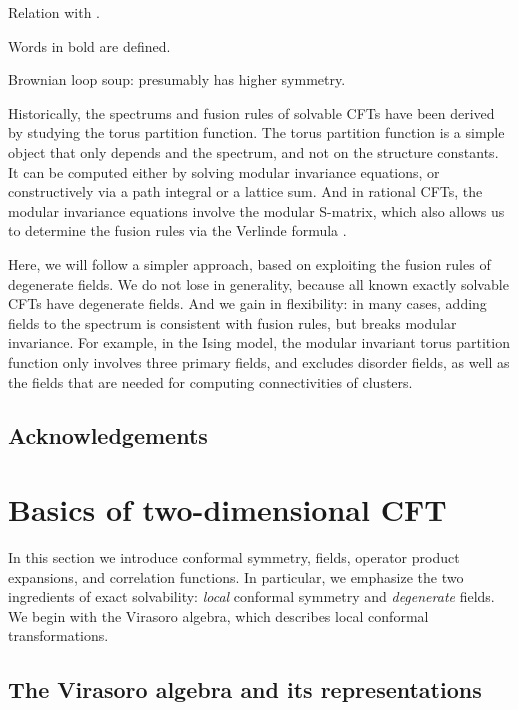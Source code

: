 \documentclass[12pt, a4paper]{article}
\theoremstyle{break}
\begin{document}
Relation with \cite{rib16}.

Words in bold are defined.


Brownian loop soup: presumably has higher symmetry.

Historically, the spectrums and fusion rules of solvable CFTs have been derived by studying the torus partition function. The torus partition function is a simple object that only depends and the spectrum, and not on the structure constants. It can be computed either by solving modular invariance equations, or constructively via a path integral or a lattice sum. And in rational CFTs, the modular invariance equations involve the modular S-matrix, which also allows us to determine the fusion rules via the Verlinde formula \cite{fms97}.

Here, we will follow a simpler approach, based on exploiting the fusion rules of degenerate fields. We do not lose in generality, because all known exactly solvable CFTs have degenerate fields. And we gain in flexibility: in many cases, adding fields to the spectrum is consistent with fusion rules, but breaks modular invariance. For example, in the Ising model, the modular invariant torus partition function only involves three primary fields, and excludes disorder fields, as well as the fields that are needed for computing connectivities of clusters.


\subsection*{Acknowledgements}



\section{Basics of two-dimensional CFT}\label{sec:bo}

In this section we introduce conformal symmetry, fields, operator product expansions, and correlation functions. In particular, we emphasize the two ingredients of exact solvability: \textit{local} conformal symmetry and \textit{degenerate} fields. We begin with the Virasoro algebra, which describes local conformal transformations. 

\subsection{The Virasoro algebra and its representations}\label{sec:vir}
\end{document}
